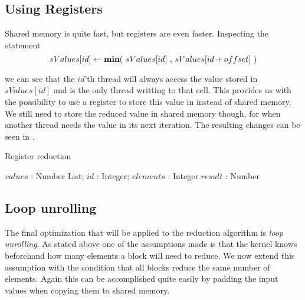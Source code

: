 \subsection{Using Registers}

Shared memory is quite fast, but registers are even faster. Inspecting
the statement 
\begin{displaymath}
  sValues[id] \leftarrow \text{\textbf{min}$($ $sValues[id]$ , $sValues[id + offset]$ $)$}
\end{displaymath}

we can see that the $id$'th thread will always access the value stored in
$sValues[id]$ and is the only thread writting to that cell. This provides us
with the possibility to use a register to store this value in instead of shared
memory. We still need to store the reduced value in shared memory though, for
when another thread needs the value in its next iteration. The resulting changes
can be seen in .

\begin{algorithm}
  \caption{Register reduction}
  \label{alg:registerReduct}
  \begin{algorithmic}
              {$values$ : Number List; $id$ : Integer; $elements$ : Integer}
              {$result$ : Number}
              {
                \SYNC
                  \ENDIF
                  \SYNC
                \ENDWHILE
                \ENDIF
              }
  \end{algorithmic}
\end{algorithm}



\subsection{Loop unrolling}\label{sec:loopUnrolling}


The final optimization that will be applied to the reduction algorithm
is \textit{loop unrolling}. As stated above one of the assumptions
made is that the kernel knows beforehand how many elements a block
will need to reduce. We now extend this assumption with the condition
that all blocks reduce the same number of elements. Again this can be
accomplished quite easily by padding the input values when copying
them to shared memory. 

